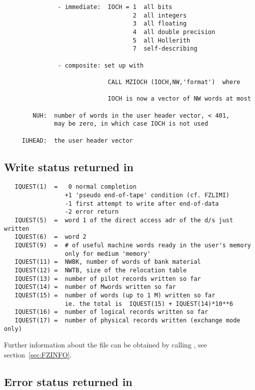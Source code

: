 \begin{verbatim}
               - immediate:  IOCH = 1  all bits
                                    2  all integers
                                    3  all floating
                                    4  all double precision
                                    5  all Hollerith
                                    7  self-describing

               - composite: set up with

                             CALL MZIOCH (IOCH,NW,'format')  where

                             IOCH is now a vector of NW words at most

        NUH:  number of words in the user header vector, < 401,
              may be zero, in which case IOCH is not used

     IUHEAD:  the user header vector
\end{verbatim}

\subsection*{Write status returned in }

\begin{verbatim}
   IQUEST(1)  =   0 normal completion
                 +1 'pseudo end-of-tape' condition (cf. FZLIMI)
                 -1 first attempt to write after end-of-data
                 -2 error return
   IQUEST(5)  =  word 1 of the direct access adr of the d/s just written
   IQUEST(6)  =  word 2
   IQUEST(9)  =  # of useful machine words ready in the user's memory
                 only for medium 'memory'
   IQUEST(11) =  NWBK, number of words of bank material
   IQUEST(12) =  NWTB, size of the relocation table
   IQUEST(13) =  number of pilot records written so far
   IQUEST(14) =  number of Mwords written so far
   IQUEST(15) =  number of words (up to 1 M) written so far
                 ie. the total is  IQUEST(15) + IQUEST(14)*10**6
   IQUEST(16) =  number of logical records written so far
   IQUEST(17) =  number of physical records written (exchange mode only)
\end{verbatim}
   Further information about the file can be obtained
   by calling , see section~\ref{sec:FZINFO}.

\subsection*{Error status returned in }

